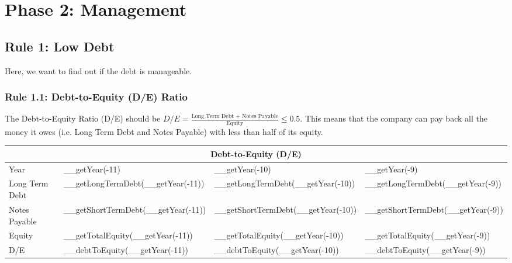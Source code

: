 \section{Phase 2: Management}

\subsection{Rule 1: Low Debt}

Here, we want to find out if the debt is manageable.

\subsubsection{{Rule 1.1: Debt-to-Equity (D/E) Ratio}}

The Debt-to-Equity Ratio (D/E) should be $D/E = \frac{\text{Long Term Debt + Notes Payable}}{\text{Equity}} \leq 0.5$.
This means that the company can pay back all the money it owes (i.e. Long Term Debt
and Notes Payable) with less than half of its equity.\\

\begin{tabularx}{\textwidth}{|X|X|X|X|}
 \hline
 \multicolumn{4}{|c|}{Debt-to-Equity (D/E)} \\
 \hline
 Year                       & __getYear(-11)                        & __getYear(-10)                        & __getYear(-9)                     \\
 \hline
 Long Term Debt             & __getLongTermDebt(__getYear(-11))     & __getLongTermDebt(__getYear(-10))     & __getLongTermDebt(__getYear(-9))  \\
 Notes Payable              & __getShortTermDebt(__getYear(-11))    & __getShortTermDebt(__getYear(-10))    & __getShortTermDebt(__getYear(-9)) \\
 Equity                     & __getTotalEquity(__getYear(-11))      & __getTotalEquity(__getYear(-10))      & __getTotalEquity(__getYear(-9))   \\
 \rowcolor{lightgray} D/E   & __debtToEquity(__getYear(-11))        & __debtToEquity(__getYear(-10))        & __debtToEquity(__getYear(-9))     \\
 \hline
\end{tabularx}\\

